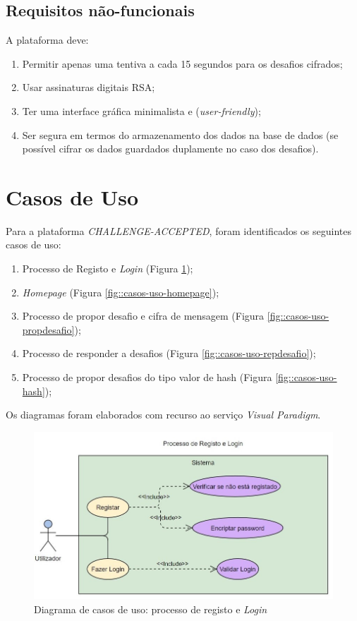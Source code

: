\subsection{Requisitos não-funcionais}
\label{ssec::engsoft:requisitos:nao-funcionais}

A plataforma deve:

\begin{enumerate}
	\item Permitir apenas uma tentiva a cada 15 segundos para os desafios cifrados;
	\item Usar assinaturas digitais \ac{RSA};
	\item Ter uma interface gráfica minimalista e (\textit{user-friendly});
	\item Ser segura em termos do armazenamento dos dados na base de dados (se possível cifrar os dados guardados duplamente no caso dos desafios).
\end{enumerate}


\section{Casos de Uso}
\label{sec::engsoft:casos-uso}

Para a plataforma \emph{CHALLENGE-ACCEPTED}, foram identificados os seguintes casos de uso:
\begin{enumerate}
	\item Processo de Registo e \emph{Login} (Figura \ref{fig::casos-uso-regis});
	\item \textit{Homepage} (Figura \ref{fig::casos-uso-homepage});
	\item Processo de propor desafio e cifra de mensagem (Figura \ref{fig::casos-uso-propdesafio});
	\item Processo de responder a desafios (Figura \ref{fig::casos-uso-repdesafio});
	\item Processo de propor desafios do tipo valor de hash (Figura \ref{fig::casos-uso-hash});
\end{enumerate}

Os diagramas foram elaborados com recurso ao serviço \textit{Visual Paradigm}.

\begin{figure}[!htbp]
	\centering
	\includegraphics[scale=0.8]{Imagens/Processo_Registo_Login.jpg}	\caption[Diagrama de casos de uso: processo de registo e \emph{Login}]{Diagrama de casos de uso: processo de registo e \emph{Login}}
	\label{fig::casos-uso-regis}
\end{figure}

